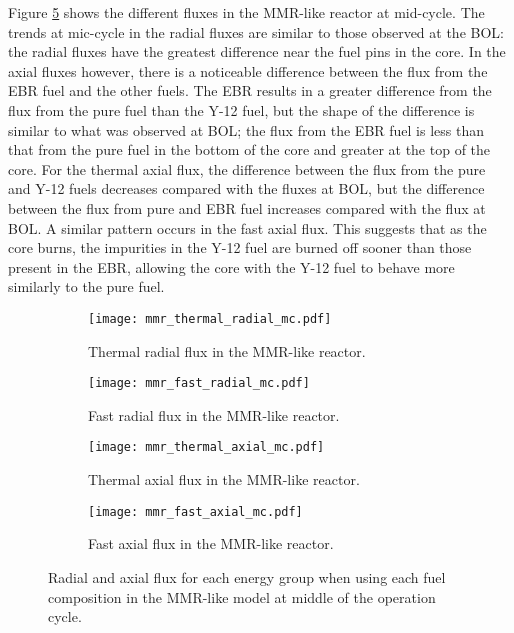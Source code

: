 Figure \ref{fig:mmr_mc} shows the different fluxes in the \gls{MMR}-like 
reactor at mid-cycle. The trends at mic-cycle in the radial fluxes are 
similar to those observed at the \gls{BOL}: the radial fluxes have the 
greatest difference near the fuel pins in the core. In the axial fluxes 
however, there is a noticeable difference between the flux from the \gls{EBR} 
fuel and the other fuels. The \gls{EBR} results in a greater difference 
from the flux from the pure fuel than the Y-12 fuel, but the shape of 
the difference is similar to what was observed at \gls{BOL}; the flux from 
the \gls{EBR} fuel is less than that from the pure fuel in the bottom of 
the core and greater at the top of the core. For the thermal axial flux, 
the difference between the flux from the pure and Y-12 fuels decreases 
compared with the fluxes at \gls{BOL}, but the difference between the flux 
from pure and \gls{EBR} fuel increases compared with the flux at \gls{BOL}. 
A similar pattern occurs in the fast axial flux. This suggests that 
as the core burns, the impurities in the Y-12 fuel are burned off sooner 
than those present in the \gls{EBR}, allowing the core with the Y-12 fuel to 
behave more similarly to the pure fuel. 

\begin{figure}
        \centering
        \begin{subfigure}[b]{0.48\textwidth}
            \centering
            \texttt{[image: mmr\_thermal\_radial\_mc.pdf]}
            \caption{Thermal radial flux in the \gls{MMR}-like reactor.}
            \label{fig:mmr_thermal_radial_mc}
        \end{subfigure}
        \hfill
        \begin{subfigure}[b]{0.48\textwidth}
            \centering
            \texttt{[image: mmr\_fast\_radial\_mc.pdf]}
            \caption{Fast radial flux in the \gls{MMR}-like reactor.}
            \label{fig:mmr_fast_radial_mc}
        \end{subfigure}
        \hfill
            
        \begin{subfigure}[b]{0.48\textwidth}
            \centering
            \texttt{[image: mmr\_thermal\_axial\_mc.pdf]}
            \caption{Thermal axial flux in the \gls{MMR}-like reactor. }
            \label{fig:mmr_thermal_axial_mc}
        \end{subfigure}
        \hfill
        \begin{subfigure}[b]{0.48\textwidth}
            \centering
            \texttt{[image: mmr\_fast\_axial\_mc.pdf]}
            \caption{Fast axial flux in the \gls{MMR}-like reactor.}
            \label{fig:mmr_fast_axial_mc}
        \end{subfigure}
        \hfill
        \caption{Radial and axial flux for each energy group when using 
        each fuel composition in the \gls{MMR}-like model at middle of 
        the operation cycle.}
        \label{fig:mmr_mc}
   \end{figure}

